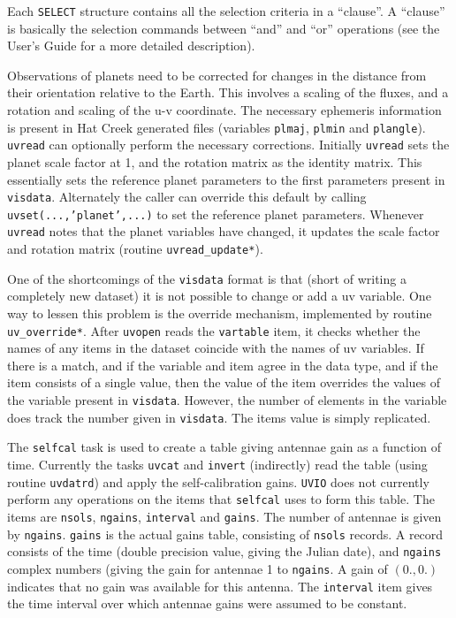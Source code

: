 Each {\tt SELECT} structure contains all the selection criteria in a ``clause''.
A ``clause'' is basically the selection commands between ``and'' and ``or''
operations (see the User's Guide for a more detailed description).


Observations of planets need to be corrected for changes in the distance
from their orientation relative to the Earth.  This involves a scaling of
the fluxes, and a rotation and scaling of the u-v coordinate. The necessary
ephemeris information is present in Hat Creek generated files
(variables {\tt plmaj}, {\tt plmin} and {\tt plangle}). {\tt uvread} can
optionally perform the necessary corrections. Initially {\tt uvread} sets
the planet scale factor at 1, and the rotation matrix as the identity matrix.
This essentially sets the reference planet parameters to the first parameters
present in {\tt visdata}. Alternately the caller can override this
default by calling {\tt uvset(...,'planet',...)} to set the reference
planet parameters.
Whenever {\tt uvread} notes that the planet variables have changed, it
updates the scale factor and rotation matrix (routine {\tt uvread\_update*}).


One of the shortcomings of the {\tt visdata} format is that (short of
writing a completely new dataset) it is not possible to change or
add a uv variable. One way to lessen this problem is the override
mechanism, implemented by routine {\tt uv\_override*}. After {\tt uvopen}
reads the {\tt vartable} item, it checks whether the names of any items
in the dataset coincide with the names of uv variables. If there is a
match, and if the variable and item agree in the data type, and if the
item consists of a single value, then the value of the item overrides the
values of the variable present in {\tt visdata}. However, the number of elements
in the variable does track the number given in {\tt visdata}. The items value
is simply replicated.


The {\tt selfcal} task is used to create a table giving antennae gain as a
function of time. Currently the tasks {\tt uvcat} and {\tt invert} (indirectly)
read the table (using routine {\tt uvdatrd}) and apply the self-calibration
gains. {\tt UVIO} does not currently perform any operations on the items that
{\tt selfcal} uses to form this table. The items are {\tt nsols}, {\tt ngains},
{\tt interval} and {\tt gains}. The number of antennae is given by
{\tt ngains}. {\tt gains} is the actual gains table, consisting
of {\tt nsols} records. A record consists of the time (double precision
value, giving the Julian date), and {\tt ngains} complex numbers (giving the
gain for antennae 1 to {\tt ngains}. A gain of $(0.,0.)$
indicates that no gain was available for this antenna. The {\tt interval}
item gives the time interval over which antennae gains were assumed to
be constant.

